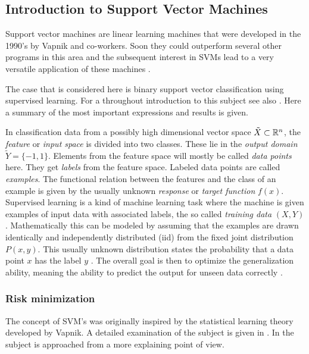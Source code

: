 
\subsection{Introduction to Support Vector Machines}
Support vector machines are linear learning machines that were developed in the 1990's by Vapnik and co-workers. Soon they could outperform several other programs in this area \cite{Cristianini2000} and the subsequent interest in SVMs lead to a very versatile application of these machines \cite{Kunapuli2008}.

The case that is considered here is binary support vector classification using supervised learning. 
For a throughout introduction to this subject see also \cite{Cristianini2000}. Here a summary of the most important expressions and results is given.

In classification data from a possibly high dimensional vector space \(\tilde{X} \subset \mathbb{R}^n\), the \emph{feature} or \emph{input space} is divided into two classes. These lie in the \emph{output domain} \(\tilde{Y} = \{-1,1\}\). Elements from the feature space will mostly be called \emph{data points} here. They get \emph{labels} from the feature space. Labeled data points are called \emph{examples}.
The functional relation between the features and the class of an example is given by the usually unknown \emph{response} or \emph{target function} \(f(x)\).
Supervised learning is a kind of machine learning task where the machine is given examples of input data with associated labels, the so called \emph{training data} \((X,Y)\). Mathematically this can be modeled by assuming that the examples are  drawn identically and independently distributed (iid) from the fixed joint distribution \(P(x,y)\). This usually unknown distribution states the probability that a data point \(x\) has the label \(y\) \cite[p. 988]{Vapnik1999}.
The overall goal is then to optimize the generalization ability, meaning the ability to predict the output for unseen data correctly \cite[chapter 1.2]{Cristianini2000}.

\subsubsection{Risk minimization}
The concept of SVM's was originally inspired by the statistical learning theory developed by Vapnik. A detailed examination of the subject is given in \cite{Vapnik1998}. In \cite{Vapnik2013} the subject is approached from a more explaining point of view.

